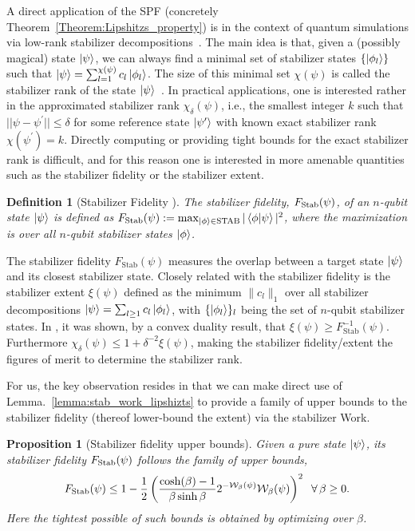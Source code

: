 \documentclass[aps,pra,superscriptaddress,twocolumn,longbibliography]{revtex4-2}
\newtheorem{proposition}{Proposition}
\newtheorem{definition}{Definition}
\begin{document}
A direct application of the SPF (concretely Theorem~\ref{Theorem:Lipshitzs_property}) is in the context of quantum simulations via low-rank stabilizer decompositions~\cite{PhysRevX.6.021043}.
The main idea is that, given a (possibly magical) state $\ket{\psi}$, we can always find a minimal set of stabilizer states $\{\ket{\phi_l}\}$ such that $\ket{\psi}=\sum_{l=1}^{\chi(\psi)}c_{l}\ket{\phi_l}$. The size of this minimal set $\chi(\psi)$ is called the stabilizer rank of the state $\ket{\psi}$~\cite{PhysRevX.6.021043}.
In practical applications, one is interested rather in the approximated stabilizer rank $\chi_{\delta}(\psi)$, i.e., the smallest integer $k$ such that $||\psi -\psi^{\prime}|| \leq \delta$ for some reference state $\ket{\psi^{\prime}}$ with known exact stabilizer rank $\chi(\psi^{\prime})=k$. 
Directly computing or providing tight bounds for the exact stabilizer rank is difficult, and for this reason one is interested in more amenable quantities such as the stabilizer fidelity or the stabilizer extent.

\begin{definition}[Stabilizer Fidelity \cite{Bravyi/stab_fidelity/2019}]
The stabilizer fidelity, $F_{\rm{Stab}}(\psi)$, of an $n$-qubit state $\ket{\psi}$ is defined as $F_{\rm{Stab}}(\psi) := \max_{\ket{\phi} \in \rm{STAB}}|\braket{\phi|\psi}|^{2}$, where the maximization is over all $n$-qubit stabilizer states $\ket{\phi}$.
\end{definition}

The stabilizer fidelity $F_{\text{Stab}}(\psi)$ measures the overlap between a target state $\ket{\psi}$ and its closest stabilizer state. 
Closely related with the stabilizer fidelity is the stabilizer extent $\xi(\psi)$ defined as the minimum $\|c_{l}\|_{1}$ over all stabilizer decompositions $\ket{\psi}=\sum_{l \geq 1} c_{l} \ket{\phi_l}$, with $\{\ket{\phi_l}\}_l$ being the set of $n$-qubit stabilizer states. 
In \cite{Bravyi/stab_fidelity/2019}, it was shown, by a convex duality result, that $\xi(\psi)\geq F_{\text{Stab}}^{-1}(\psi)$. 
Furthermore $\chi_{\delta}(\psi) \leq 1 + \delta^{-2}\xi(\psi)$, making the stabilizer fidelity/extent the figures of merit to determine the stabilizer rank.

For us, the key observation resides in that we can make direct use of Lemma.~\ref{lemma:stab_work_lipshizts} to provide a family of upper bounds to the stabilizer fidelity (thereof lower-bound the extent) via the stabilizer Work.  


\begin{proposition}[Stabilizer fidelity upper bounds]
\label{proposition:stab_fidellity_upper_bound}
Given a pure state $\ket{\psi}$, its stabilizer fidelity $F_{\rm{Stab}}(\psi)$ follows the family of upper bounds,
%
\begin{equation*}
    F_{\rm{Stab}}(\psi) \leq 1- \frac{1}{2}\left(\frac{ \cosh(\beta)-1}{\beta\sinh{\beta}}2^{-\mathcal{W}_{\beta}(\psi)}\mathcal{W}_{\beta}(\psi)\right)^{2} \;\; \forall\, \beta\geq 0.
\end{equation*}
%
Here the tightest possible of such bounds is obtained by optimizing over $\beta$. 
\end{proposition}
\end{document}
